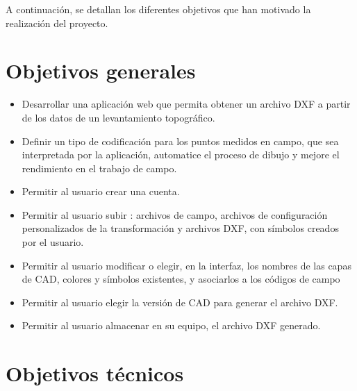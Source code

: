 
A continuación, se detallan los diferentes objetivos que han motivado la realización del proyecto.
\section{Objetivos generales}
\begin{itemize}

	\item Desarrollar una aplicación web que permita obtener un archivo DXF a partir de los datos de un levantamiento topográfico.

	\item Definir un tipo de codificación para los puntos medidos en campo, que sea interpretada por la aplicación, automatice el proceso de dibujo y mejore el rendimiento en el trabajo de campo.

	\item Permitir al usuario crear una cuenta.

	\item Permitir al usuario subir :  archivos de campo, archivos de configuración personalizados de la transformación y archivos DXF, con símbolos creados por el usuario.

	\item Permitir al usuario modificar o elegir, en la interfaz, los nombres de las capas de CAD, colores y símbolos existentes, y asociarlos a los códigos de campo

	\item Permitir al usuario elegir la versión de CAD para generar el archivo DXF.

	\item Permitir al usuario almacenar en su equipo, el archivo DXF generado.
\end{itemize}
\section{Objetivos técnicos}

